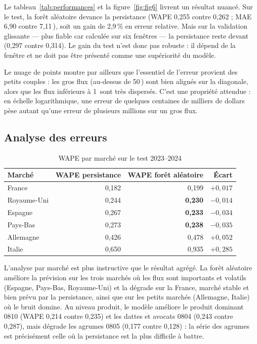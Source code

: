 \documentclass[11pt,a4paper]{article}
\newcommand{\MUSD}{\,\text{M USD}}
\begin{document}
Le tableau~\ref{tab:performances} et la figure~\ref{fig:fig6} livrent un
résultat nuancé. Sur le test, la forêt aléatoire devance la persistance
(WAPE 0,255 contre 0,262 ; MAE 6,90 contre 7,11\MUSD), soit un gain de 2,9\,\%
en erreur relative. Mais sur la validation glissante --- plus fiable car
calculée sur six fenêtres --- la persistance reste devant (0,297 contre 0,314).
Le gain du test n'est donc pas robuste : il dépend de la fenêtre et ne doit pas
être présenté comme une supériorité du modèle.

Le nuage de points montre par ailleurs que l'essentiel de l'erreur provient des
petits couples : les gros flux (au-dessus de 50\MUSD) sont bien alignés sur la
diagonale, alors que les flux inférieurs à 1\MUSD{} sont très dispersés. C'est
une propriété attendue : en échelle logarithmique, une erreur de quelques
centaines de milliers de dollars pèse autant qu'une erreur de plusieurs millions
sur un gros flux.

\subsection{Analyse des erreurs}

\begin{table}[H]
\centering
\caption{WAPE par marché sur le test 2023--2024}\label{tab:erreurs}
\begin{tabular}{lrrr}
\toprule
Marché & WAPE persistance & WAPE forêt aléatoire & Écart \\
\midrule
France & 0,182 & 0,199 & $+0,017$ \\
Royaume-Uni & 0,244 & \textbf{0,230} & $-0,014$ \\
Espagne & 0,267 & \textbf{0,233} & $-0,034$ \\
Pays-Bas & 0,273 & \textbf{0,238} & $-0,035$ \\
Allemagne & 0,426 & 0,478 & $+0,052$ \\
Italie & 0,650 & 0,935 & $+0,285$ \\
\bottomrule
\end{tabular}
\end{table}

L'analyse par marché est plus instructive que le résultat agrégé. La forêt
aléatoire améliore la prévision sur les trois marchés où les flux sont
importants et volatils (Espagne, Pays-Bas, Royaume-Uni) et la dégrade sur la
France, marché stable et bien prévu par la persistance, ainsi que sur les petits
marchés (Allemagne, Italie) où le bruit domine. Au niveau produit, le modèle
améliore le produit dominant 0810 (WAPE 0,214 contre 0,235) et les dattes et
avocats 0804 (0,243 contre 0,287), mais dégrade les agrumes 0805 (0,177 contre
0,128) : la série des agrumes est précisément celle où la persistance est la
plus difficile à battre.
\end{document}
